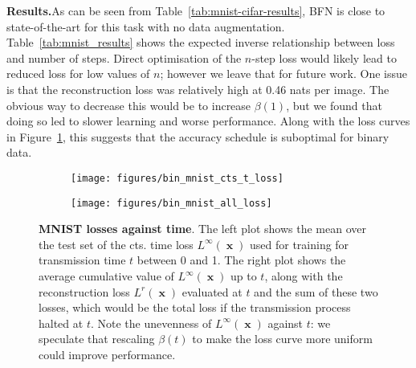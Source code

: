 \documentclass[11pt,table]{article}
\DeclareMathOperator{\x}{\mathbf{x}}
\newcommand{\0}[1]{\constvec{0}{#1}}
\newcommand{\1}[1]{\constvec{1}{#1}}
\begin{document}
\noindent\textbf{Results.}\quad As can be seen from Table~\ref{tab:mnist-cifar-results}, BFN is close to state-of-the-art for this task with no data augmentation. 
Table~\ref{tab:mnist_results} shows the expected inverse relationship between loss and number of steps.
Direct optimisation of the $n$-step loss would likely lead to reduced loss for low values of $n$; however we leave that for future work.
One issue is that the reconstruction loss was relatively high at 0.46 nats per image. 
The obvious way to decrease this would be to increase $\beta(1)$, but we found that doing so led to slower learning and worse performance.
Along with the loss curves in Figure~\ref{fig:bin_mnist_loss}, this suggests that the accuracy schedule is suboptimal for binary data.

\begin{figure}[t!]
\centering
\begin{subfigure}{.49\textwidth}
  \centering
  \texttt{[image: figures/bin\_mnist\_cts\_t\_loss]}
\end{subfigure}
\begin{subfigure}{.49\textwidth}
  \centering
  \texttt{[image: figures/bin\_mnist\_all\_loss]}
\end{subfigure}
\caption{\textbf{MNIST losses against time}. The left plot shows the mean over the test set of the cts. time loss $L^{\infty}(\x)$ used for training for transmission time $t$ between 0 and 1. The right plot shows the average cumulative value of $L^{\infty}(\x)$ up to $t$, along with the reconstruction loss $L^r(\x)$ evaluated at $t$ and the sum of these two losses, which would be the total loss if the transmission process halted at $t$.
Note the unevenness of $L^{\infty}(\x)$ against $t$: we speculate that rescaling $\beta(t)$ to make the loss curve more uniform could improve performance.}
\label{fig:bin_mnist_loss}
\end{figure}
\end{document}
